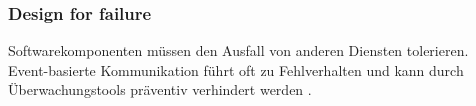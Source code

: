 
\subsubsection{\glqq Design for failure\grqq{}}
Softwarekomponenten müssen den Ausfall von anderen Diensten tolerieren. 
Event-basierte Kommunikation führt oft zu Fehlverhalten und kann durch Überwachungstools präventiv verhindert werden \cite{FowlerMicroservice}. 
